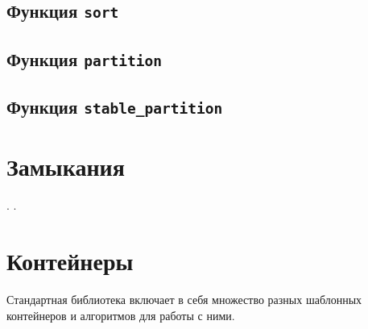 \documentclass{article}
\begin{document}
\subsection*{Функция \texttt{sort}}
\subsection*{Функция \texttt{partition}}
\subsection*{Функция \texttt{stable\_partition}}



\newpage
\section*{Замыкания}



\newpage
.
\newpage
.
\newpage



\section*{Контейнеры}
Стандартная библиотека включает в себя множество разных шаблонных контейнеров и алгоритмов для работы с ними.
\end{document}

